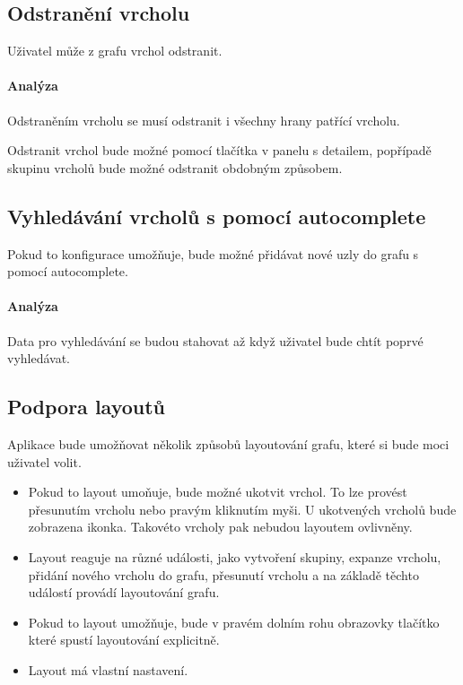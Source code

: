 \newpage

\subsection{Odstranění vrcholu}
Uživatel může z grafu vrchol odstranit.

\paragraph{Analýza} Odstraněním vrcholu se musí odstranit i všechny hrany patřící vrcholu.

Odstranit vrchol bude možné pomocí tlačítka v panelu s detailem, popřípadě skupinu vrcholů bude možné odstranit obdobným způsobem.

\subsection{Vyhledávání vrcholů s pomocí autocomplete}
Pokud to konfigurace umožňuje, bude možné přidávat nové uzly do grafu s pomocí autocomplete.

\paragraph{Analýza} Data pro vyhledávání se budou stahovat až když uživatel bude chtít poprvé vyhledávat.

\subsection{Podpora layoutů}
Aplikace bude umožňovat několik způsobů layoutování grafu, které si bude moci uživatel volit.

\begin{itemize}
    \item Pokud to layout umoňuje, bude možné ukotvit vrchol. To lze provést přesunutím vrcholu nebo pravým kliknutím myši. U ukotvených vrcholů bude zobrazena ikonka. Takovéto vrcholy pak nebudou layoutem ovlivněny.
    \item Layout reaguje na různé události, jako vytvoření skupiny, expanze vrcholu, přidání nového vrcholu do grafu, přesunutí vrcholu a na základě těchto událostí provádí layoutování grafu.
    \item Pokud to layout umožňuje, bude v pravém dolním rohu obrazovky tlačítko které spustí layoutování explicitně.
    \item Layout má vlastní nastavení.
\end{itemize}

